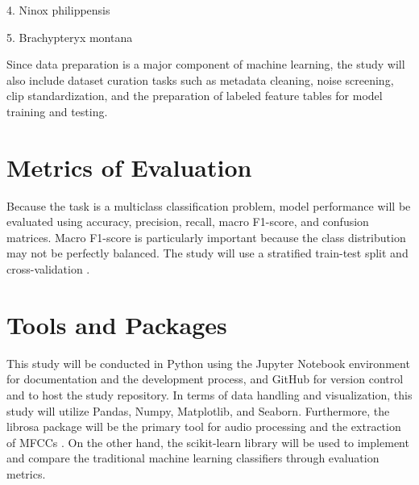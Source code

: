 \documentclass[runningheads]{llncs}
\begin{document}
4. Ninox philippensis 

5. Brachypteryx montana 

Since data preparation is a major component of machine learning, the study will also include dataset curation tasks such as metadata cleaning, noise screening, clip standardization, and the preparation of labeled feature tables for model training and testing.

\section{Metrics of Evaluation}

Because the task is a multiclass classification problem, model performance will be evaluated using accuracy, precision, recall, macro F1-score, and confusion matrices. Macro F1-score is particularly important because the class distribution may not be perfectly balanced. The study will use a stratified train-test split and cross-validation \cite{sklearn_f1}.

\section{Tools and Packages}

This study will be conducted in Python using the Jupyter Notebook environment for documentation and the development process, and GitHub for version control and to host the study repository. In terms of data handling and visualization, this study will utilize Pandas, Numpy, Matplotlib, and Seaborn. Furthermore, the librosa package will be the primary tool for audio processing and the extraction of MFCCs \cite{librosa_mfcc}. On the other hand, the scikit-learn library will be used to implement and compare the traditional machine learning classifiers through evaluation metrics.



\end{document}
